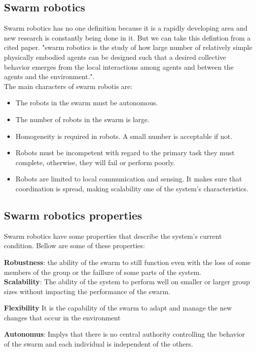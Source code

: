 \documentclass[12pt]{article}
\begin{document}
 

\subsection{Swarm robotics}
Swarm robotics has no one definition because it is a rapidly developing area and new research is constantly being done in it. But we can take this defintion from a cited paper.
"swarm robotics is the study of how large number of relatively simple physically embodied agents can be
designed such that a desired collective behavior emerges from the local interactions among agents
and between the agents and the environment."\cite{csahin2005swarm}.\\

The main characters of swarm robotis are:
\begin{itemize}
  \item  The robots in the swarm must be autonomous. 
  \item The number of robots in the swarm is large.
  \item Homogeneity is required in robots. A small number is acceptable if not.
  \item Robots must be incompetent  with regard to the primary task they must complete, otherwise, they will fail or perform poorly.
  \item Robots are limited to local communication and sensing. It makes sure that coordination is spread, making scalability one of the system's characteristics.\cite{navarro2013introduction}
\end{itemize}


\subsection{Swarm robotics properties}
Swarm robotics have some properties that describe the system's current condition. Bellow are some of these properties:

\textbf{Robustness}: the ability of the swarm to  still function even with the loss of some members of the group or the faillure of some parts of the system.\\
\textbf{Scalability}: The ability of the system to perform well on smaller or larger group sizes without impacting the performance of the swarm.

\textbf{Flexibility} It is the capability of the swarm to adapt and manage the new changes that occur in the environment 

\textbf{Autonomus}: Implys that there is no central authority controlling the behavior of the swarm and each individual is independent of the others.
\end{document}
